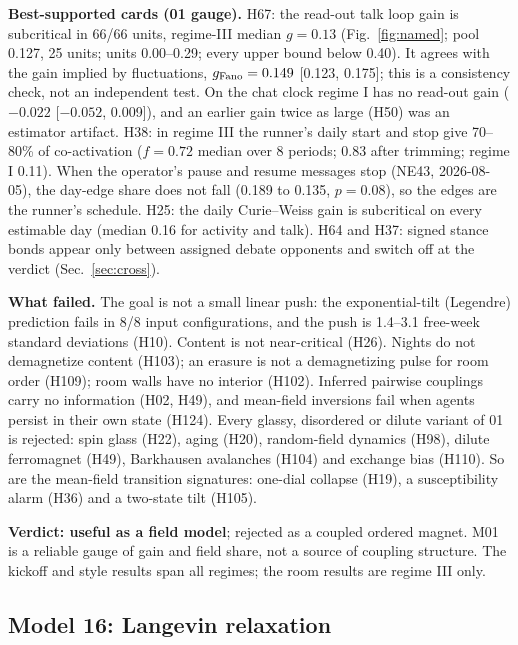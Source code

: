 \textbf{Best-supported cards (01 gauge).} H67: the read-out talk loop gain is subcritical in 66/66 units, regime-III median $g=0.13$ (Fig.~\ref{fig:named}; pool 0.127, 25 units; units 0.00--0.29; every upper bound below 0.40). It agrees with the gain implied by fluctuations, $g_{\rm Fano}=0.149$ [0.123, 0.175]; this is a consistency check, not an independent test. On the chat clock regime I has no read-out gain ($-0.022$ [$-0.052$, 0.009]), and an earlier gain twice as large (H50) was an estimator artifact. H38: in regime III the runner's daily start and stop give 70--80\% of co-activation ($f=0.72$ median over 8 periods; 0.83 after trimming; regime I 0.11). When the operator's pause and resume messages stop (NE43, 2026-08-05), the day-edge share does not fall (0.189 to 0.135, $p=0.08$), so the edges are the runner's schedule. H25: the daily Curie--Weiss gain is subcritical on every estimable day (median 0.16 for activity and talk). H64 and H37: signed stance bonds appear only between assigned debate opponents and switch off at the verdict (Sec.~\ref{sec:cross}).

\textbf{What failed.} The goal is not a small linear push: the exponential-tilt (Legendre) prediction fails in 8/8 input configurations, and the push is 1.4--3.1 free-week standard deviations (H10). Content is not near-critical (H26). Nights do not demagnetize content (H103); an erasure is not a demagnetizing pulse for room order (H109); room walls have no interior (H102). Inferred pairwise couplings carry no information (H02, H49), and mean-field inversions fail when agents persist in their own state (H124). Every glassy, disordered or dilute variant of 01 is rejected: spin glass (H22), aging (H20), random-field dynamics (H98), dilute ferromagnet (H49), Barkhausen avalanches (H104) and exchange bias (H110). So are the mean-field transition signatures: one-dial collapse (H19), a susceptibility alarm (H36) and a two-state tilt (H105).

\textbf{Verdict: useful as a field model}; rejected as a coupled ordered magnet. M01 is a reliable gauge of gain and field share, not a source of coupling structure. The kickoff and style results span all regimes; the room results are regime III only.

\subsection{Model 16: Langevin relaxation}\label{sec:m16}

